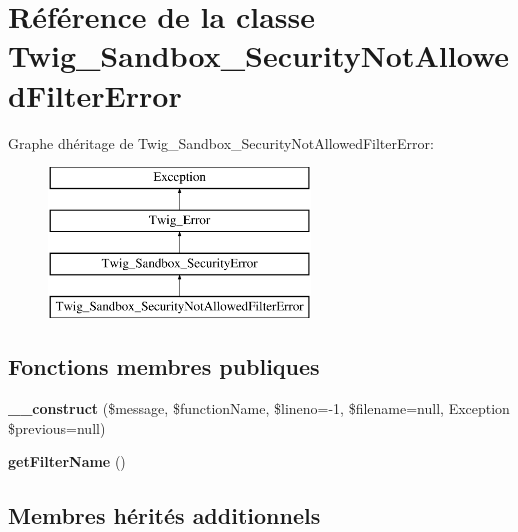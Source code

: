 \hypertarget{class_twig___sandbox___security_not_allowed_filter_error}{}\section{Référence de la classe Twig\+\_\+\+Sandbox\+\_\+\+Security\+Not\+Allowed\+Filter\+Error}
\label{class_twig___sandbox___security_not_allowed_filter_error}
Graphe d\textquotesingle{}héritage de Twig\+\_\+\+Sandbox\+\_\+\+Security\+Not\+Allowed\+Filter\+Error\+:\begin{figure}[H]
\begin{center}
\leavevmode
\includegraphics[height=4.000000cm]{class_twig___sandbox___security_not_allowed_filter_error}
\end{center}
\end{figure}
\subsection*{Fonctions membres publiques}
\begin{DoxyCompactItemize}
\item 
{\bfseries \+\_\+\+\_\+construct} (\$message, \$function\+Name, \$lineno=-\/1, \$filename=null, Exception \$previous=null)\hypertarget{class_twig___sandbox___security_not_allowed_filter_error_a298d4f275321abb754e9ec89d847fc4c}{}\label{class_twig___sandbox___security_not_allowed_filter_error_a298d4f275321abb754e9ec89d847fc4c}

\item 
{\bfseries get\+Filter\+Name} ()\hypertarget{class_twig___sandbox___security_not_allowed_filter_error_ab02e143afc00e7cd0e9e4c299ebbb2b1}{}\label{class_twig___sandbox___security_not_allowed_filter_error_ab02e143afc00e7cd0e9e4c299ebbb2b1}

\end{DoxyCompactItemize}
\subsection*{Membres hérités additionnels}


